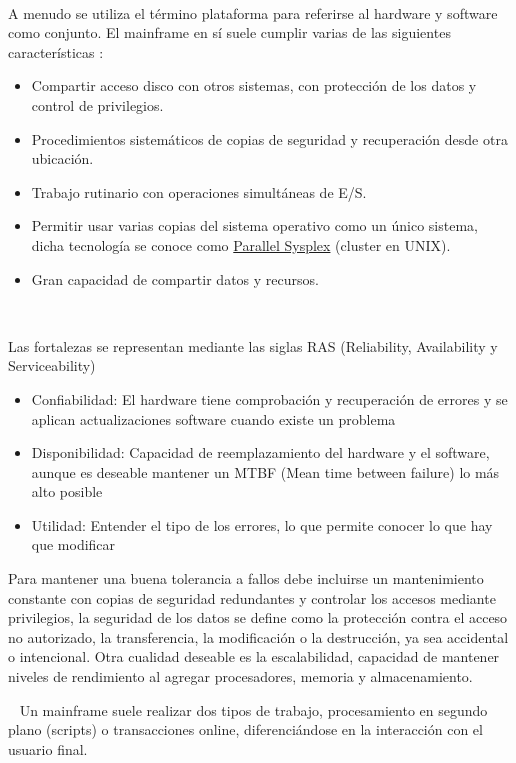 \documentclass[paper=a4, fontsize=10pt]{scrartcl} %
\numberwithin{equation}{section} %
\numberwithin{figure}{section} %
\numberwithin{table}{section} %
\begin{document}
\

A menudo se utiliza el término plataforma para referirse al hardware y software como conjunto. El mainframe en sí suele cumplir varias de las siguientes características \cite{ibm-mainframes}:
\begin{itemize}
	\item Compartir acceso disco con otros sistemas, con protección de los datos y control de privilegios.
	\item Procedimientos sistemáticos de copias de seguridad y recuperación desde otra ubicación.
	\item Trabajo rutinario con operaciones simultáneas de E/S. %
	\item Permitir usar varias copias del sistema operativo como un único sistema, dicha tecnología se conoce como \href{https://www-03.ibm.com/systems/z/advantages/pso/}{Parallel Sysplex} (cluster en UNIX).
	\item Gran capacidad de compartir datos y recursos.
\end{itemize}

\

Las fortalezas se representan mediante las siglas RAS (Reliability, Availability y Serviceability)
\begin{itemize}
	\item Confiabilidad: El hardware tiene comprobación y recuperación de errores y se aplican actualizaciones software cuando existe un problema
	\item Disponibilidad: Capacidad de reemplazamiento del hardware y el software, aunque es deseable mantener un MTBF (Mean time between failure) lo más alto posible
	\item Utilidad: Entender el tipo de los errores, lo que permite conocer lo que hay que modificar
\end{itemize}

Para mantener una buena tolerancia a fallos debe incluirse un mantenimiento constante con copias de seguridad redundantes y controlar los accesos mediante privilegios, la seguridad de los datos se define como la protección contra el acceso no autorizado, la transferencia, la modificación o la destrucción, ya sea accidental o intencional.
Otra cualidad deseable es la escalabilidad, capacidad de mantener niveles de rendimiento al agregar procesadores, memoria y almacenamiento.

\
Un mainframe suele realizar dos tipos de trabajo, procesamiento en segundo plano (scripts) o transacciones online, diferenciándose en la interacción con el usuario final.
\end{document}
